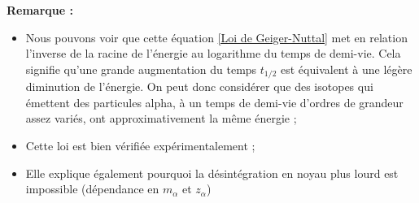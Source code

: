 \documentclass{book}
\begin{document}
\bf{Remarque : }{\begin{itemize}
  \item Nous pouvons voir que cette équation \ref{Loi de Geiger-Nuttal} met en relation l'inverse de la racine de l'énergie au logarithme du temps de demi-vie.
  Cela signifie qu'une grande augmentation du temps $t_{1/2}$ est équivalent à une légère diminution de l'énergie. On peut donc considérer que des isotopes qui émettent des particules alpha, à un temps de demi-vie d'ordres de grandeur assez variés, ont approximativement la même énergie ;
  \item Cette loi est bien vérifiée expérimentalement ;
  \item Elle explique également pourquoi la désintégration en noyau plus lourd est impossible (dépendance en $m_{\alpha}$ et $z_{\alpha}$) {\color{red}{Pourquoi???}}
\end{itemize}
}
\end{document}
